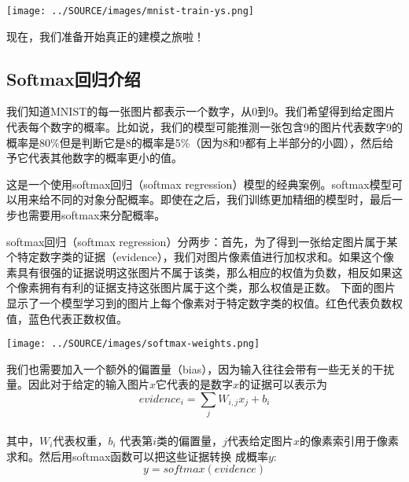 \begin{center}
\texttt{[image: ../SOURCE/images/mnist-train-ys.png]}
\end{center}

现在，我们准备开始真正的建模之旅啦！

\subsection {Softmax回归介绍}

我们知道MNIST的每一张图片都表示一个数字，从0到9。我们希望得到给定图片代表每个数字的概率。比如说，我们的模型可能推测一张包含9的图片代表数字9的概率是80\%但是判断它是8的概率是5\%（因为8和9都有上半部分的小圆），然后给予它代表其他数字的概率更小的值。

这是一个使用softmax回归（softmax regression）模型的经典案例。softmax模型可以用来给不同的对象分配概率。即使在之后，我们训练更加精细的模型时，最后一步也需要用softmax来分配概率。

softmax回归（softmax regression）分两步：首先，为了得到一张给定图片属于某个特定数字类的证据（evidence），我们对图片像素值进行加权求和。如果这个像素具有很强的证据说明这张图片不属于该类，那么相应的权值为负数，相反如果这个像素拥有有利的证据支持这张图片属于这个类，那么权值是正数。
下面的图片显示了一个模型学习到的图片上每个像素对于特定数字类的权值。红色代表负数权值，蓝色代表正数权值。


\begin{center}
\texttt{[image: ../SOURCE/images/softmax-weights.png]}
\end{center}

我们也需要加入一个额外的偏置量（bias），因为输入往往会带有一些无关的干扰量。因此对于给定的输入图片$x$它代表的是数字$x$的证据可以表示为\\
\begin{equation}
evidence_i = \sum_j{W_{i,j}}x_j+b_i
\end{equation}\\
其中，$W_i$代表权重，$b_i$ 代表第$i$类的偏置量，$j$代表给定图片$x$的像素索引用于像素求和。然后用softmax函数可以把这些证据转换
成概率$y$:\\
\begin{equation}
y = softmax(evidence)
\end{equation}

